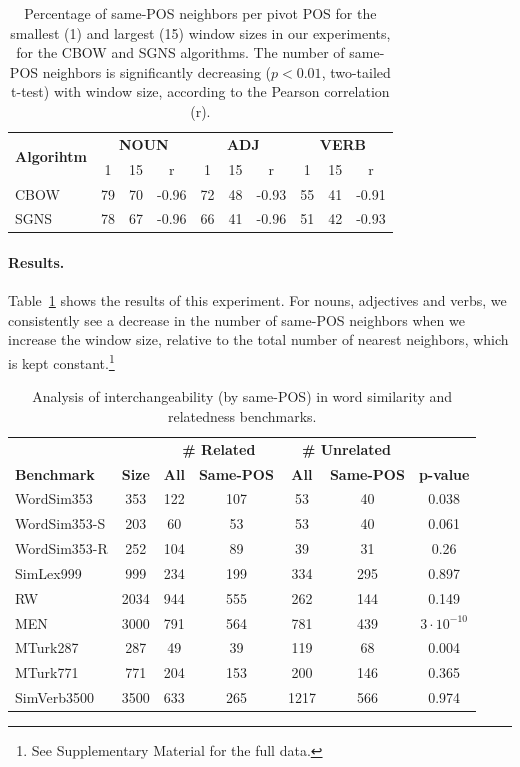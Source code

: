 \documentclass[11pt,a4paper]{article}
\begin{document}
    \begin{table}[t]
    \centering
    \setlength\tabcolsep{2.75pt}
    \begin{tabular}{l|ccc|ccc|ccc}
    \multirow{2}{1cm}{\bf Algorihtm}
    & \multicolumn{3}{c|}{\bf NOUN} & \multicolumn{3}{c|}{\bf ADJ} & \multicolumn{3}{c}{\bf VERB} \\
    & 1 & 15 & r & 1 & 15 & r & 1 & 15 & r \\
    \hline
    CBOW & 79 & 70 & -0.96 & 72 & 48 & -0.93 & 55 & 41 & -0.91 \\
    SGNS & 78 & 67 & -0.96 & 66 & 41 & -0.96 & 51 & 42 & -0.93 
    \end{tabular}
    \caption{Percentage of same-POS neighbors per pivot POS for the smallest (1) and largest (15)
        window sizes in our experiments, for the CBOW and SGNS algorithms.
        The number of same-POS neighbors is significantly decreasing ($p<0.01$, two-tailed t-test)
        with window size, according to the Pearson correlation (r).
    \label{tab:nn_pos_hist}}
    \end{table}
    
    \paragraph{Results.}
    
    Table~\ref{tab:nn_pos_hist} shows the results of this experiment.
    For nouns, adjectives and verbs, we consistently see a decrease in
    the  number of same-POS neighbors when we increase the window size,
    relative to the total number of nearest neighbors, which is kept
    constant.\footnote{See Supplementary Material for the full data.}
    
    
    
    \begin{table}[t]
    \centering
    \begin{tabular}{l|c|cc|cc|c}
    && \multicolumn{2}{c|}{\bf \# Related} & \multicolumn{2}{c|}{\bf \# Unrelated} & \\
    \bf Benchmark & \bf Size & \bf All & \bf Same-POS & \bf All & \bf Same-POS & \bf p-value \\
    \hline
    WordSim353 & 353 & 122 & 107 & 53 & 40 & 0.038 \\
    WordSim353-S & 203 & 60 & 53 & 53 & 40 & 0.061 \\
    WordSim353-R & 252 & 104 & 89 & 39 & 31 & 0.26 \\
    SimLex999 & 999 & 234 & 199 & 334 & 295 & 0.897 \\
    RW & 2034 & 944 & 555 & 262 & 144 & 0.149 \\
    MEN & 3000 & 791 & 564 & 781 & 439 & $3\cdot10^{-10}$ \\
    MTurk287 & 287 & 49 & 39 & 119 & 68 & 0.004 \\
    MTurk771 & 771 & 204 & 153 & 200 & 146 & 0.365 \\
    SimVerb3500 & 3500 & 633 & 265 & 1217 & 566 & 0.974
    \end{tabular}
    \caption{Analysis of interchangeability (by same-POS) in
    word similarity and relatedness benchmarks.
    \label{tab:benchmark_enrichment}}
    \end{table}
    
\end{document}
